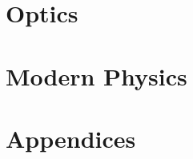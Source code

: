 \documentclass[oneside,draft]{book}
\theoremstyle{definition}
\begin{document}
\part{Optics}





\part{Modern Physics}









\backmatter

\appendix 
\part{Appendices}



\printindex
\end{document}
